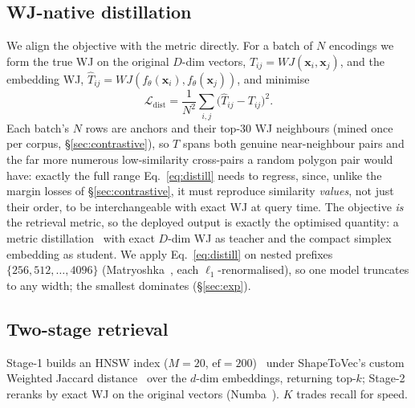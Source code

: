 \documentclass[sigconf]{acmart}
\begin{document}
\subsection{WJ-native distillation}
\label{sec:distill}
We align the objective with the metric directly. For a batch of $N$ encodings we
form the true WJ on the original $D$-dim vectors, $T_{ij}=WJ(\mathbf{x}_i,\mathbf{x}_j)$,
and the embedding WJ, $\hat T_{ij}=WJ(f_\theta(\mathbf{x}_i),f_\theta(\mathbf{x}_j))$, and minimise
\begin{equation}
  \mathcal{L}_{\mathrm{dist}}=\frac{1}{N^2}\sum_{i,j}\big(\hat T_{ij}-T_{ij}\big)^2 .
  \label{eq:distill}
\end{equation}
Each batch's $N$ rows are anchors and their top-30 WJ neighbours (mined once per
corpus, \S\ref{sec:contrastive}), so $T$ spans both genuine near-neighbour pairs and
the far more numerous low-similarity cross-pairs a random polygon pair would have:
exactly the full range Eq.~\eqref{eq:distill} needs to regress, since, unlike the
margin losses of \S\ref{sec:contrastive}, it must reproduce similarity
\emph{values}, not just their order, to be interchangeable with exact WJ at query
time.
The objective \emph{is} the retrieval metric, so the deployed output is exactly the
optimised quantity: a metric distillation~\cite{hinton15} with exact $D$-dim WJ
as teacher and the compact simplex embedding as student. We apply
Eq.~\eqref{eq:distill} on nested prefixes $\{256, 512, \dots,4096\}$
(Matryoshka~\cite{matryoshka22}, each $\ell_1$-renormalised), so one model truncates
to any width; the smallest %
dominates (\S\ref{sec:exp}).

\subsection{Two-stage retrieval}
Stage-1 builds an HNSW index ($M{=}20$, $\mathrm{ef}{=}200$)~\cite{hnsw20} under
ShapeToVec's custom Weighted Jaccard distance~\cite{shape2vec} over the $d$-dim
embeddings, returning top-$k$; Stage-2 reranks by exact WJ on the original vectors
(Numba~\cite{lam15}). $K$ trades recall for speed.

\end{document}
